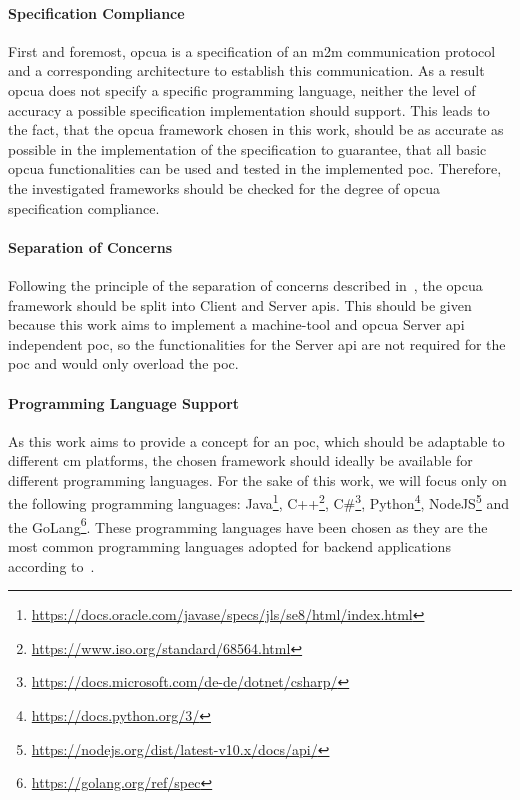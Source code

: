 \documentclass[
a4paper,
twoside,
headsepline,
cleardoublepage=empty,
parskip=half,
draft=false
]{scrbook}
\begin{document}
			\paragraph{Specification Compliance} First and foremost, \gls{opcua} is a specification of an \gls{m2m} communication protocol and a corresponding architecture to establish this communication. 
			As a result \gls{opcua} does not specify a specific programming language, neither the level of accuracy a possible specification implementation should support. 
			This leads to the fact, that the \gls{opcua} framework chosen in this work, should be as accurate as possible in the implementation of the specification to guarantee, that all basic \gls{opcua} functionalities can be used and tested in the implemented \gls{poc}. 
			Therefore, the investigated frameworks should be checked for the degree of \gls{opcua} specification compliance.
			
			\paragraph{Separation of Concerns} Following the principle of the separation of concerns described in~\cite{hursch1995separation}, the \gls{opcua} framework should be split into Client and Server \gls{api}s.
			This should be given because this work aims to implement a machine-tool and \gls{opcua} Server \gls{api} independent \gls{poc}, so the functionalities for the Server \gls{api} are not required for the \gls{poc} and would only overload the \gls{poc}.
			
			\paragraph{Programming Language Support} As this work aims to provide a concept for an \gls{poc}, which should be adaptable to different \gls{cm} platforms, the chosen framework should ideally be available for different programming languages. 
			For the sake of this work, we will focus only on the following programming languages: Java\footnote{\url{https://docs.oracle.com/javase/specs/jls/se8/html/index.html}}, C++\footnote{\url{https://www.iso.org/standard/68564.html}}, C\#\footnote{\url{https://docs.microsoft.com/de-de/dotnet/csharp/}}, Python\footnote{\url{https://docs.python.org/3/}}, NodeJS\footnote{\url{https://nodejs.org/dist/latest-v10.x/docs/api/}} and the GoLang\footnote{\url{https://golang.org/ref/spec}}.
			These programming languages have been chosen as they are the most common programming languages adopted for backend applications according to~\cite{jain2017evolution}.
			
\end{document}
